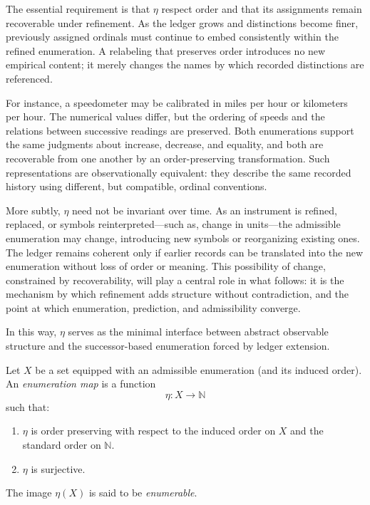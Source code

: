 The essential requirement is that $\eta$ respect order and that its assignments
remain recoverable under refinement. As the ledger grows and distinctions become
finer, previously assigned ordinals must continue to embed consistently within
the refined enumeration. A relabeling that preserves order introduces no new
empirical content; it merely changes the names by which recorded distinctions
are referenced.

For instance, a speedometer may be calibrated in miles
per hour or kilometers per hour. The numerical values differ, but the ordering of
speeds and the relations between successive readings are preserved. Both
enumerations support the same judgments about increase, decrease, and equality,
and both are recoverable from one another by an order-preserving transformation.
Such representations are observationally equivalent: they describe the same
recorded history using different, but compatible, ordinal conventions.

More subtly, $\eta$ need not be invariant over time. As an instrument is refined,
replaced, or symbols reinterpreted---such as, change in units---the admissible 
enumeration may change, introducing
new symbols or reorganizing existing ones. The ledger remains coherent only if
earlier records can be translated into the new enumeration without loss of
order or meaning. This possibility of change, constrained by recoverability,
will play a central role in what follows: it is the mechanism by which refinement
adds structure without contradiction, and the point at which enumeration,
prediction, and admissibility converge.

In this way, $\eta$ serves as the minimal interface between abstract observable
structure and the successor-based enumeration forced by ledger extension.

\begin{definition}
\label{def:eta}
Let $X$ be a set equipped with an admissible enumeration (and its induced order).
An \emph{enumeration map} is a function
\[
\eta : X \to \mathbb{N}
\]
such that:
\begin{enumerate}
\item $\eta$ is order preserving with respect to the induced order on $X$ and the
standard order on $\mathbb{N}$.
\item $\eta$ is surjective.
\end{enumerate}
The image $\eta(X)$ is said to be \emph{enumerable}.
\end{definition}

